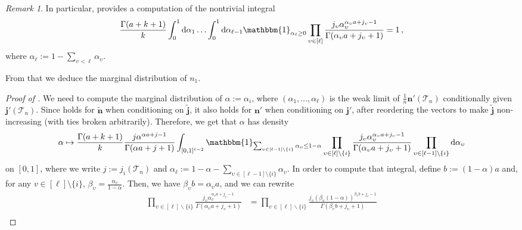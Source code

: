 \documentclass{article}
\theoremstyle{remark}
\newtheorem{remark}{Remark}
\newcommand{\cT}{\mathcal{T}}
\newcommand{\bj}{\mathbf{j}}
\newcommand{\bn}{\mathbf{n}}
\newcommand{\wbj}{\widetilde{\bj}}
\newcommand{\wbn}{\widetilde{\bn}}
\newcommand{\One}[1]{\mathbbm{1}_{#1}}
\begin{document}
\begin{remark}
In particular,  provides a computation of the nontrivial integral
    \begin{equation*}
        \frac{\Gamma(a+k+1)}{k} \int_{0}^{1} \mathrm{d}\alpha_1 \ldots \int_{0}^{1} \mathrm{d}\alpha_{\ell-1} \One{\alpha_\ell\ge0}
        \prod_{\upsilon\in[\ell]} \frac{j_\upsilon \alpha_\upsilon^{\alpha_\upsilon a +j_\upsilon -1}}{\Gamma(\alpha_\upsilon a+j_\upsilon +1)}
        = 1 \,,
    \end{equation*}
    where $\alpha_\ell := 1 - \sum_{\upsilon<\ell} \alpha_\upsilon$.
\end{remark}

From that we deduce the marginal distribution of $n_1$.

\begin{proof}[Proof of ]
We need to compute the marginal distribution of $\alpha :=\alpha_{i}$, where $(\alpha_1, \dots, \alpha_\ell)$ is the weak limit of $\frac1n\bn'(\cT_n)$ conditionally given $\bj'(\cT_n)$.
Since  holds for $\wbn$ when conditioning on $\wbj$, it also holds for $\bn'$ when conditioning on $\bj'$, after reordering the vectors to make $\wbj$ non-increasing (with ties broken arbitrarily).
Therefore, we get that $\alpha$ has density
\begin{align*}
    \alpha \mapsto \frac{\Gamma(a+k+1)}{k} \frac{j \alpha^{\alpha a +j-1}}{\Gamma(\alpha a+j+1)} 
    \int_{[0,1]^{\ell-2}} \One{\sum_{\upsilon\in[\ell-1]\setminus\{i\}} \alpha_\upsilon \le 1-\alpha}
    \prod_{\upsilon \in [\ell] \backslash \{i\}} \frac{j_\upsilon \alpha_\upsilon^{\alpha_\upsilon a +j_\upsilon-1}}{\Gamma(\alpha_\upsilon a+j_\upsilon+1)} 
    \prod_{\upsilon\in[\ell-1]\setminus\{i\}} \mathrm{d}\alpha_{\upsilon}
\end{align*}
on $[0,1]$, where we write $j:=j_i(\cT_n)$ and $\alpha_\ell := 1-\alpha - \sum_{\upsilon\in[\ell-1]\setminus\{i\}} \alpha_\upsilon$.
In order to compute that integral, define $b := (1-\alpha) a$ and, for any $v \in [\ell]\setminus\{i\}$, $\beta_\upsilon = \frac{\alpha_\upsilon}{1-\alpha}$. 
Then, we have $\beta_\upsilon b=\alpha_\upsilon a$, and we can rewrite
\begin{align*}
    \prod_{\upsilon \in [\ell] \backslash \{i\}} \frac{j_\upsilon \alpha_\upsilon^{\alpha_\upsilon a +j_\upsilon-1}}{\Gamma(\alpha_\upsilon a+j_\upsilon+1)} &= \prod_{\upsilon \in [\ell] \backslash \{i\}} \frac{j_\upsilon (\beta_\upsilon(1-\alpha))^{\beta_\upsilon b +j_\upsilon-1}}{\Gamma(\beta_\upsilon b+j_\upsilon+1)}\\

\end{align*}
\end{proof}
\end{document}
